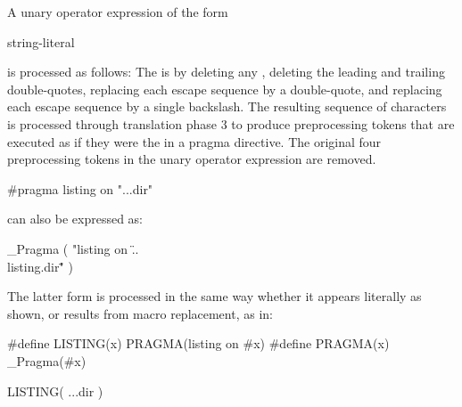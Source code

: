 \pnum
A unary operator expression of the form
\begin{ncbnf}
 \terminal{(} string-literal \terminal{)}
\end{ncbnf}
is processed as follows: The  is 
by deleting any , deleting the leading and trailing
double-quotes, replacing each escape sequence  by a double-quote, and
replacing each escape sequence \tcode{\textbackslash\textbackslash} by a single
backslash. The resulting sequence of characters is processed through translation phase 3
to produce preprocessing tokens that are executed as if they were the
 in a pragma directive. The original four preprocessing
tokens in the unary operator expression are removed.

\pnum
\begin{example}
\begin{codeblock}
#pragma listing on "..\listing.dir"
\end{codeblock}
can also be expressed as:
\begin{codeblock}
_Pragma ( "listing on \"..\\listing.dir\"" )
\end{codeblock}
The latter form is processed in the same way whether it appears literally
as shown, or results from macro replacement, as in:
\begin{codeblock}
#define LISTING(x) PRAGMA(listing on #x)
#define PRAGMA(x) _Pragma(#x)

LISTING( ..\listing.dir )
\end{codeblock}
\end{example}

